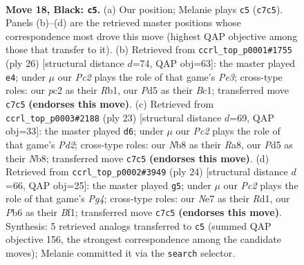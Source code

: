 \documentclass[11pt]{article}
\begin{document}
\clearpage

\begin{figure}[p]\centering
\begin{subfigure}{0.46\textwidth}\centering
\resizebox{\linewidth}{!}{%
\newchessgame
\chessboard[
  setfen={1nb1qrk1/1rp1nppp/1p2p3/1N1pP3/p2P1P2/6K1/PPP3PP/R2Q1BNR b - - 3 18},
  showmover=false,
  pgfstyle=straightmove, color=movearrow, markmove={c7-c5}
]}
\caption{}
\end{subfigure}\hfill
\begin{subfigure}{0.46\textwidth}\centering
\resizebox{\linewidth}{!}{%
\newchessgame
\chessboard[
  setfen={1rbq1rk1/1pp2pbp/p5p1/3np3/PP6/3PP1P1/4NPBP/1RBQ1RK1 w - - 0 14},
  showmover=false,
  pgfstyle=straightmove, color=movearrow, markmove={e3-e4}
]}
\caption{}
\end{subfigure}
\\[4pt]
\begin{subfigure}{0.46\textwidth}\centering
\resizebox{\linewidth}{!}{%
\newchessgame
\chessboard[
  setfen={rn1q1rk1/p1pp2pp/1p2pb2/4N3/2PPp3/4B1P1/PP2PP1P/R2Q1RK1 b - - 1 12},
  showmover=false,
  pgfstyle=straightmove, color=movearrow, markmove={d7-d6}
]}
\caption{}
\end{subfigure}\hfill
\begin{subfigure}{0.46\textwidth}\centering
\resizebox{\linewidth}{!}{%
\newchessgame
\chessboard[
  setfen={r1b2rk1/pp1nqppp/2p1p3/3p4/2PP2P1/2Q1PN2/PP3P1P/2KR1BR1 w - - 1 13},
  showmover=false,
  pgfstyle=straightmove, color=movearrow, markmove={g4-g5}
]}
\caption{}
\end{subfigure}
\caption{\textbf{Move 18, Black: \texttt{c5}.} (a) Our position; Melanie plays \texttt{c5} (\texttt{c7c5}). Panels (b)--(d) are the retrieved master positions whose correspondence most drove this move (highest QAP objective among those that transfer to it). (b) Retrieved from \texttt{ccrl\_top\_p0001\#1755} (ply 26) [structural distance $d$=74, QAP obj=63]: the master played \texttt{e4}; under $\mu$ our \emph{Pc2} plays the role of that game's \emph{Pe3}; cross-type roles: our \emph{p}c2 as their \emph{R}b1, our \emph{P}d5 as their \emph{B}c1; transferred move \texttt{c7c5} \textbf{(endorses this move)}. (c) Retrieved from \texttt{ccrl\_top\_p0003\#2188} (ply 23) [structural distance $d$=69, QAP obj=33]: the master played \texttt{d6}; under $\mu$ our \emph{Pc2} plays the role of that game's \emph{Pd2}; cross-type roles: our \emph{N}b8 as their \emph{R}a8, our \emph{P}d5 as their \emph{N}b8; transferred move \texttt{c7c5} \textbf{(endorses this move)}. (d) Retrieved from \texttt{ccrl\_top\_p0002\#3949} (ply 24) [structural distance $d$=66, QAP obj=25]: the master played \texttt{g5}; under $\mu$ our \emph{Pc2} plays the role of that game's \emph{Pg4}; cross-type roles: our \emph{N}e7 as their \emph{R}d1, our \emph{P}b6 as their \emph{B}f1; transferred move \texttt{c7c5} \textbf{(endorses this move)}. Synthesis: 5 retrieved analogs transferred to \texttt{c5} (summed QAP objective 156, the strongest correspondence among the candidate moves); Melanie committed it via the \texttt{search} selector.}
\label{fig:thought-m35}
\end{figure}
\end{document}
